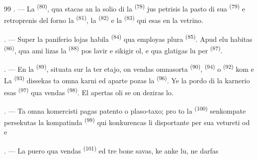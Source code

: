 \begin{VUpage}[101]{99}
. --- La  \textsuperscript{(80)}, qua stacas an la solio\nl
di la  \textsuperscript{(78)} jus petrisis la pasto di sua\nl
{} \textsuperscript{(79)} e retroprenis del forno la  \textsuperscript{(81)},\nl
la  \textsuperscript{(82)} e la  \textsuperscript{(83)} qui esas en la\nl
vetrino.

. --- Super la paniferio lojas habila \cc
{} \textsuperscript{(84)} qua employas plura  \textsuperscript{(85)}.\nl
Apud elu habitas  \textsuperscript{(86)}, qua ami\cc
lizas la  \textsuperscript{(88)} pos lavir e sikigir ol, e qua\nl
glatigas lu per  \textsuperscript{(87)}.

\VUsaut{4.0mm}
\VUsaut{3.0mm}

. --- En la  \textsuperscript{(89)}, situata sur la ter\cc
etajo, on vendas omnasorta \nl
{} \textsuperscript{(90)},  \textsuperscript{(94)} o  \textsuperscript{(92)}\nl
kom  e \nl
La  \textsuperscript{(93)} dissekas ta omna karni\nl
ed aparte pozas la  \textsuperscript{(96)}. Ye la pordo\nl
di la karnerio esas  \textsuperscript{(97)} qua\nl
vendas  \textsuperscript{(98)}. El apertas oli se on deziras\nl
lo.

. --- Ta omna komercisti pagas patento o\nl
plaso-taxo; pro to la  \textsuperscript{(100)} senkompate\nl
persekutas la kompatinda \cc
{} \textsuperscript{(99)} qui konkurencas li disportante per sua\nl
vetureti  od \cc
{}\nl
e 

\VUsaut{4.0mm}
\VUsaut{3.0mm}

. --- La puero qua vendas  \textsuperscript{(101)} ed\nl
{} tre bone savas, ke anke lu, ne darfas
\parplein
\end{VUpage}

